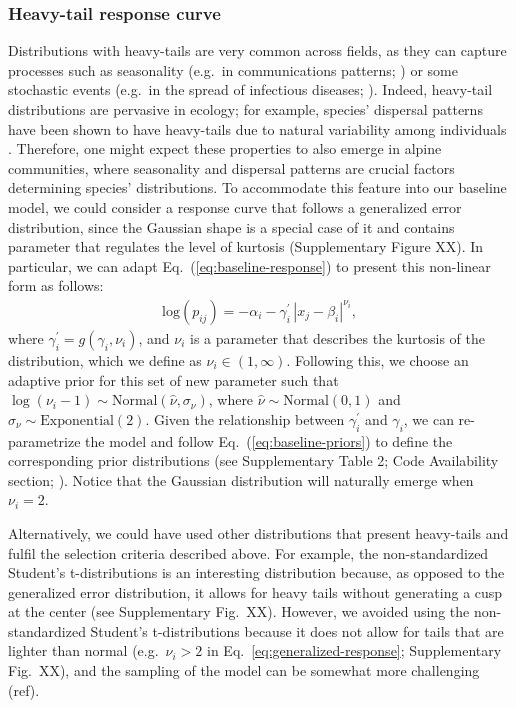 \documentclass[11pt, a4paper]{article}
\begin{document}
\subsubsection*{Heavy-tail response curve}
Distributions with heavy-tails are very common across fields, as they can capture processes such as seasonality (e.g.~in communications patterns; \citealt{malmgrenPoissonianExplanationHeavy2008}) or some stochastic events (e.g.~in the spread of infectious diseases; \citealt{wongEvidenceThatCoronavirus2020}). Indeed, heavy-tail distributions are pervasive in ecology; for example, species' dispersal patterns have been shown to have heavy-tails due to natural variability among individuals \citep{petrovskiiDispersalStatisticallyStructured2009}. Therefore, one might expect these properties to also emerge in alpine communities, where seasonality and dispersal patterns are crucial factors determining species' distributions. To accommodate this feature into our baseline model, we could consider a response curve that follows a generalized error distribution, since the Gaussian shape is a special case of it and contains parameter that regulates the level of kurtosis (Supplementary Figure XX). In particular, we can adapt Eq.~(\ref{eq:baseline-response}) to present this non-linear form as follows:
\begin{equation}
\begin{split}
\text{log}\left(p_{ij}\right) = -\alpha_{i} - \gamma^{\prime}_{i}\, |x_{j}-\beta_{i}|^{\nu_{i}} ,
\end{split}
\label{eq:generalized-response}
\end{equation}
where $\gamma^{\prime}_{i} = g(\gamma_{i}, \nu_{i})$, and $\nu_{i}$ is a parameter that describes the kurtosis of the distribution, which we define as $\nu_{i}\in\left(1, \infty\right)$. Following this, we choose an adaptive prior for this set of new parameter such that $\log\left(\nu_{i}-1\right)\sim \text{Normal}\left(\hat{\nu}, \sigma_{\nu}\right)$, where $\hat{\nu}\sim\text{Normal}\left(0, 1\right)$ and $\sigma_{\nu}\sim\text{Exponential}\left(2\right)$. Given the relationship between $\gamma^{\prime}_{i}$ and $\gamma_{i}$,  we can re-parametrize the model and follow Eq.~(\ref{eq:baseline-priors}) to define the corresponding prior distributions (see Supplementary Table 2; Code Availability section; \citealt{nadarajahGeneralizedNormalDistribution2005}). Notice that the Gaussian distribution will naturally emerge when $\nu_i=2$.

Alternatively, we could have used other distributions that present heavy-tails and fulfil the selection criteria described above. For example, the non-standardized Student's t-distributions is an interesting distribution because, as opposed to the generalized error distribution, it allows for heavy tails without generating a cusp at the center (see Supplementary Fig.~XX). However, we avoided using the non-standardized Student's t-distributions because it does not allow for tails that are lighter than normal (e.g.~$\nu_i>2$ in Eq.~\ref{eq:generalized-response}; Supplementary Fig.~XX), and the sampling of the model can be somewhat more challenging (ref). 
\end{document}
